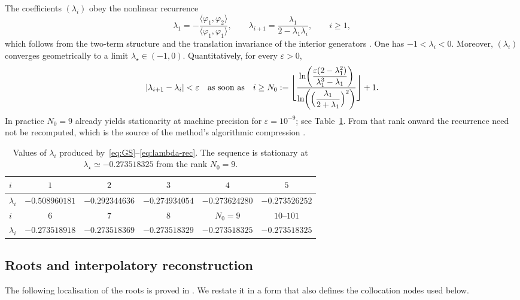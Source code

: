 \documentclass[final,3p,times]{elsarticle}
\theoremstyle{plain}
\theoremstyle{definition}
\theoremstyle{remark}
\begin{document}
The coefficients $(\lambda_i)$ obey the nonlinear recurrence
\begin{equation}
\label{eq:lambda-rec}
\lambda_1=-\frac{\langle\varphi_1,\varphi_2\rangle}{\langle\varphi_1,\varphi_1\rangle},
\qquad
\lambda_{i+1}=\frac{\lambda_1}{2-\lambda_1\lambda_i},
\qquad i\ge 1,
\end{equation}
which follows from the two-term structure and the translation invariance of
the interior generators \cite{Bsiss2023,Malek2022}. One has
$-1<\lambda_i<0$. Moreover, $(\lambda_i)$ converges geometrically to a limit
$\lambda_\star\in(-1,0)$. Quantitatively, for every $\varepsilon>0$,
\begin{equation}
\label{eq:N0}
\lvert\lambda_{i+1}-\lambda_i\rvert<\varepsilon
\quad\text{as soon as}\quad
i\ge N_0
:=\Biggl\lfloor
\frac{\displaystyle\ln\biggl(\frac{\varepsilon(2-\lambda_1^2)}{\lambda_1^3-\lambda_1}\biggr)}
{\displaystyle\ln\biggl(\Bigl(\frac{\lambda_1}{2+\lambda_1}\Bigr)^2\biggr)}
\Biggr\rfloor+1.
\end{equation}
In practice $N_0=9$ already yields stationarity at machine precision for
$\varepsilon=10^{-9}$; see Table~\ref{tab:lambda}. From that rank onward the
recurrence need not be recomputed, which is the source of the method's
algorithmic compression \cite{Bsiss2023}.

\begin{table}[htbp]
\centering
\caption{Values of $\lambda_i$ produced by~\eqref{eq:GS}--\eqref{eq:lambda-rec}.
The sequence is stationary at $\lambda_\star\simeq -0.273518325$ from the rank
$N_0=9$.}
\label{tab:lambda}
\begin{tabular}{lccccc}
\toprule
$i$ & $1$ & $2$ & $3$ & $4$ & $5$ \\
\midrule
$\lambda_i$
& $-0.508960181$ & $-0.292344636$ & $-0.274934054$
& $-0.273624280$ & $-0.273526252$ \\
\midrule
$i$ & $6$ & $7$ & $8$ & $N_0=9$ & $10$--$101$ \\
\midrule
$\lambda_i$
& $-0.273518918$ & $-0.273518369$ & $-0.273518329$
& $-0.273518325$ & $-0.273518325$ \\
\bottomrule
\end{tabular}
\end{table}

\subsection{Roots and interpolatory reconstruction}
\label{sec:roots}

The following localisation of the roots is proved in
\cite{Malek2022,Malek2021,Bsiss2017}. We restate it in a form that also
defines the collocation nodes used below.
\end{document}
